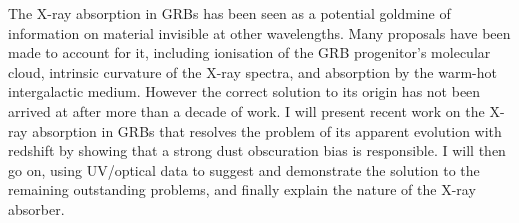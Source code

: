 


\bigskip



\bigskip

\noindent The X-ray absorption in GRBs has been seen as a potential goldmine of information on material invisible at other wavelengths. Many proposals have been made to account for it, including ionisation of the GRB progenitor’s molecular cloud, intrinsic curvature of the X-ray spectra, and absorption by the warm-hot intergalactic medium.  However the correct solution to its origin has not been arrived at after more than a decade of work. I will present recent work on the X-ray absorption in GRBs that resolves the  problem of its apparent evolution with redshift by showing that a strong dust obscuration bias is responsible. I will then go on, using UV/optical data to suggest and demonstrate the solution to the remaining outstanding problems, and finally explain the nature of the X-ray absorber.


